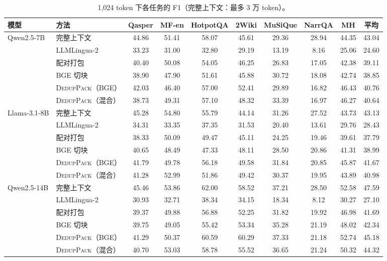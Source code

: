 \documentclass[11pt]{article}
\newcommand{\spk}{\textsc{DedupPack}}
\begin{document}
\begin{table}[t]
\centering
\small
\setlength{\tabcolsep}{4pt}
\begin{tabular}{llcccccc|cc}
\toprule
模型 & 方法 & Qasper & MF-en & HotpotQA & 2Wiki & MuSiQue & NarrQA & MH & 平均 \\
\midrule
\multirow{6}{*}{Qwen2.5-7B}
 & 完整上下文 & 44.86 & 51.41 & 58.07 & 45.61 & 29.36 & 28.94 & 44.35 & 43.04 \\
 & LLMLingua-2 & 33.23 & 31.00 & 32.80 & 29.19 & 13.19 & 8.16 & 25.06 & 24.60 \\
 & 配对打包 & 40.40 & 50.08 & 54.05 & 46.25 & 26.83 & 17.05 & 42.38 & 39.11 \\
 & BGE 切块 & 38.90 & 47.90 & 51.61 & 45.88 & 30.72 & 18.08 & 42.74 & 38.85 \\
 & \spk{}（BGE） & 42.03 & 46.40 & 57.00 & 52.41 & 29.89 & 16.82 & 46.43 & 40.76 \\
 & \spk{}（混合） & 38.73 & 49.31 & 57.10 & 48.32 & 33.39 & 16.97 & 46.27 & 40.64 \\
\midrule
\multirow{6}{*}{Llama-3.1-8B}
 & 完整上下文 & 45.28 & 54.80 & 55.79 & 44.14 & 31.26 & 27.52 & 43.73 & 43.13 \\
 & LLMLingua-2 & 34.31 & 33.35 & 37.35 & 31.53 & 20.40 & 13.61 & 29.76 & 28.43 \\
 & 配对打包 & 38.33 & 50.09 & 49.47 & 45.11 & 24.25 & 19.46 & 39.61 & 37.79 \\
 & BGE 切块 & 40.65 & 48.49 & 47.33 & 48.11 & 28.50 & 20.86 & 41.31 & 38.99 \\
 & \spk{}（BGE） & 41.79 & 49.78 & 56.18 & 49.58 & 31.84 & 20.85 & 45.87 & 41.67 \\
 & \spk{}（混合） & 41.28 & 52.99 & 51.86 & 49.42 & 30.37 & 19.95 & 43.89 & 40.98 \\
\midrule
\multirow{6}{*}{Qwen2.5-14B}
 & 完整上下文 & 45.46 & 53.86 & 62.00 & 58.52 & 37.21 & 28.50 & 52.58 & 47.59 \\
 & LLMLingua-2 & 30.93 & 32.71 & 38.34 & 34.15 & 18.34 & 8.12 & 30.27 & 27.10 \\
 & 配对打包 & 39.37 & 49.88 & 56.88 & 52.25 & 31.82 & 19.92 & 46.98 & 41.69 \\
 & BGE 切块 & 39.75 & 49.05 & 55.42 & 53.34 & 35.28 & 21.19 & 48.02 & 42.34 \\
 & \spk{}（BGE） & 41.29 & 50.37 & 60.59 & 60.29 & 37.33 & 21.18 & 52.74 & 45.18 \\
 & \spk{}（混合） & 40.70 & 53.03 & 58.78 & 55.52 & 36.65 & 21.24 & 50.32 & 44.32 \\
\bottomrule
\end{tabular}
\caption{1,024 token 下各任务的 F1（完整上下文：最多 3 万 token）。}
\label{tab:pertask}
\end{table}
\end{document}
